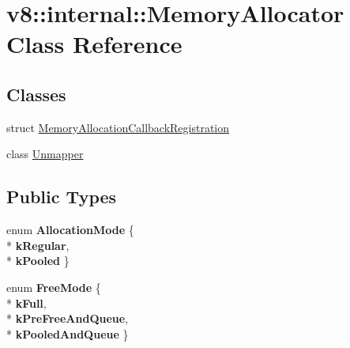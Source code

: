 \hypertarget{classv8_1_1internal_1_1_memory_allocator}{}\section{v8\+:\+:internal\+:\+:Memory\+Allocator Class Reference}
\label{classv8_1_1internal_1_1_memory_allocator}
\subsection*{Classes}
\begin{DoxyCompactItemize}
\item 
struct \hyperlink{structv8_1_1internal_1_1_memory_allocator_1_1_memory_allocation_callback_registration}{Memory\+Allocation\+Callback\+Registration}
\item 
class \hyperlink{classv8_1_1internal_1_1_memory_allocator_1_1_unmapper}{Unmapper}
\end{DoxyCompactItemize}
\subsection*{Public Types}
\begin{DoxyCompactItemize}
\item 
enum {\bfseries Allocation\+Mode} \{ \\*
{\bfseries k\+Regular}, 
\\*
{\bfseries k\+Pooled}
 \}\hypertarget{classv8_1_1internal_1_1_memory_allocator_a11e35bec1fa662a922430a198cf7bbab}{}\label{classv8_1_1internal_1_1_memory_allocator_a11e35bec1fa662a922430a198cf7bbab}

\item 
enum {\bfseries Free\+Mode} \{ \\*
{\bfseries k\+Full}, 
\\*
{\bfseries k\+Pre\+Free\+And\+Queue}, 
\\*
{\bfseries k\+Pooled\+And\+Queue}
 \}\hypertarget{classv8_1_1internal_1_1_memory_allocator_a1c5f0a0deae321ce11d19b7be506ed8b}{}\label{classv8_1_1internal_1_1_memory_allocator_a1c5f0a0deae321ce11d19b7be506ed8b}

\end{DoxyCompactItemize}
